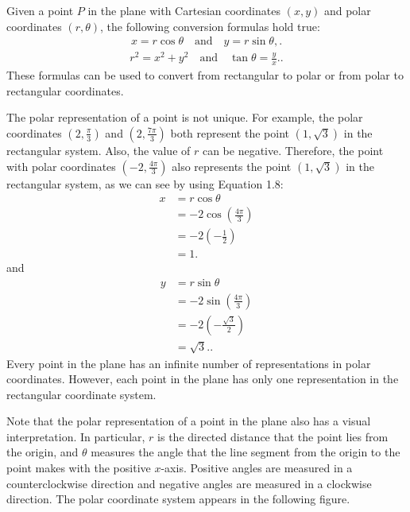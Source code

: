 \documentclass{report}
\begin{document}
    \bigbreak \noindent 
    \begin{thrmm}
        Given a point \( P \) in the plane with Cartesian coordinates \((x, y)\) and polar coordinates \((r, \theta)\), the following conversion formulas hold true:
        \begin{align*}
            x = r \cos \theta \quad \text{and} \quad y = r \sin \theta,
        .\end{align*}
        \begin{align*}
            r^2 = x^2 + y^2 \quad \text{and} \quad \tan \theta = \frac{y}{x}.
        .\end{align*}
        These formulas can be used to convert from rectangular to polar or from polar to rectangular coordinates.
    \end{thrmm}

    \pagebreak \bigbreak \noindent 
    The polar representation of a point is not unique. For example, the polar coordinates \((2, \frac{\pi}{3})\) and \((2, \frac{7\pi}{3})\) both represent the point \((1, \sqrt{3})\) in the rectangular system. Also, the value of \( r \) can be negative. Therefore, the point with polar coordinates \((-2, \frac{4\pi}{3})\) also represents the point \((1, \sqrt{3})\) in the rectangular system, as we can see by using Equation 1.8:
    \begin{align*}
        x &= r \cos \theta \\
        &= -2 \cos\left(\frac{4\pi}{3}\right) \\
        &= -2 \left(-\frac{1}{2}\right) \\
        &= 1
    .\end{align*}
    and
    \begin{align*}
        y &= r \sin \theta \\
        &= -2 \sin\left(\frac{4\pi}{3}\right) \\
        &= -2 \left(-\frac{\sqrt{3}}{2}\right) \\
        &= \sqrt{3}.
    .\end{align*}
    Every point in the plane has an infinite number of representations in polar coordinates. However, each point in the plane has only one representation in the rectangular coordinate system.
    \bigbreak \noindent 
    \begin{minipage}[]{0.47\textwidth}
        Note that the polar representation of a point in the plane also has a visual interpretation. In particular, \( r \) is the directed distance that the point lies from the origin, and \( \theta \) measures the angle that the line segment from the origin to the point makes with the positive \( x \)-axis. Positive angles are measured in a counterclockwise direction and negative angles are measured in a clockwise direction. The polar coordinate system appears in the following figure.
    \end{minipage}
    \hspace{.1in}
    \begin{minipage}[]{0.47\textwidth}
    \end{minipage}
\end{document}
